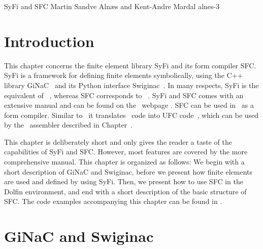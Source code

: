              {SyFi and SFC}
              {Martin Sandve Aln\ae s and Kent-Andre Mardal}
              {alnes-3}

\renewcommand{\AA}{\mathbf{A}}
\newcommand{\LL}{\mathbf{L}}
\newcommand{\JJ}{\mathbf{J}}

\section{Introduction}

This chapter concerns the finite element library SyFi and its form compiler SFC. 
SyFi is a framework for defining finite elements symbolically, using the 
C++ library GiNaC~\cite{BauerFrinkEtAl2000} and its Python interface Swiginac~\cite{www:swiginac}. In many respects, SyFi is 
the equivalent of \fiat~\cite{Kirby2006}, whereas SFC corresponds to \ffc~\cite{KirbyLogg2008b,Logg2007d}. SyFi and SFC comes with
an extensive manual \cite{AlnaesMardal2009a} and can be found on the \fenics\ webpage \cite{AlnaesMardal2009c}. 
SFC can be used in \fenics\ as a form compiler. Similar to \ffc\ it translates \ufl\ code
into UFC code~\cite{logg-4,AlnaesLangtangenEtAl2007, AlnaesLoggEtAl2009}, which can be used by the \dolfin\ assembler described in Chapter~\cite{logg-3}. 

This chapter is deliberately short and only gives the reader a taste of the capabilities of SyFi and SFC. 
However, most features are covered by the more comprehensive manual. 
This chapter is organized as follows: We begin with a short description of GiNaC 
and Swiginac, before we present how finite elements are used and defined by using SyFi.   
Then, we present how to use SFC in the Dolfin environment, and end with a short description of the basic structure of SFC. 
The code examples accompanying this chapter can be found in  
.

\section{GiNaC and Swiginac}

